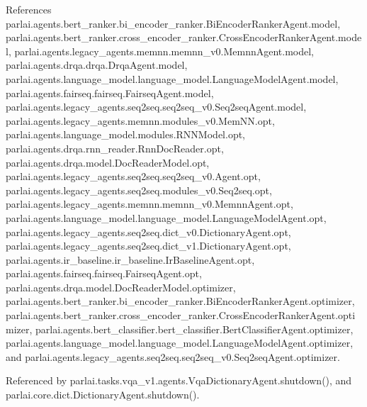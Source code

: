 References parlai.\+agents.\+bert\+\_\+ranker.\+bi\+\_\+encoder\+\_\+ranker.\+Bi\+Encoder\+Ranker\+Agent.\+model, parlai.\+agents.\+bert\+\_\+ranker.\+cross\+\_\+encoder\+\_\+ranker.\+Cross\+Encoder\+Ranker\+Agent.\+model, parlai.\+agents.\+legacy\+\_\+agents.\+memnn.\+memnn\+\_\+v0.\+Memnn\+Agent.\+model, parlai.\+agents.\+drqa.\+drqa.\+Drqa\+Agent.\+model, parlai.\+agents.\+language\+\_\+model.\+language\+\_\+model.\+Language\+Model\+Agent.\+model, parlai.\+agents.\+fairseq.\+fairseq.\+Fairseq\+Agent.\+model, parlai.\+agents.\+legacy\+\_\+agents.\+seq2seq.\+seq2seq\+\_\+v0.\+Seq2seq\+Agent.\+model, parlai.\+agents.\+legacy\+\_\+agents.\+memnn.\+modules\+\_\+v0.\+Mem\+N\+N.\+opt, parlai.\+agents.\+language\+\_\+model.\+modules.\+R\+N\+N\+Model.\+opt, parlai.\+agents.\+drqa.\+rnn\+\_\+reader.\+Rnn\+Doc\+Reader.\+opt, parlai.\+agents.\+drqa.\+model.\+Doc\+Reader\+Model.\+opt, parlai.\+agents.\+legacy\+\_\+agents.\+seq2seq.\+seq2seq\+\_\+v0.\+Agent.\+opt, parlai.\+agents.\+legacy\+\_\+agents.\+seq2seq.\+modules\+\_\+v0.\+Seq2seq.\+opt, parlai.\+agents.\+legacy\+\_\+agents.\+memnn.\+memnn\+\_\+v0.\+Memnn\+Agent.\+opt, parlai.\+agents.\+language\+\_\+model.\+language\+\_\+model.\+Language\+Model\+Agent.\+opt, parlai.\+agents.\+legacy\+\_\+agents.\+seq2seq.\+dict\+\_\+v0.\+Dictionary\+Agent.\+opt, parlai.\+agents.\+legacy\+\_\+agents.\+seq2seq.\+dict\+\_\+v1.\+Dictionary\+Agent.\+opt, parlai.\+agents.\+ir\+\_\+baseline.\+ir\+\_\+baseline.\+Ir\+Baseline\+Agent.\+opt, parlai.\+agents.\+fairseq.\+fairseq.\+Fairseq\+Agent.\+opt, parlai.\+agents.\+drqa.\+model.\+Doc\+Reader\+Model.\+optimizer, parlai.\+agents.\+bert\+\_\+ranker.\+bi\+\_\+encoder\+\_\+ranker.\+Bi\+Encoder\+Ranker\+Agent.\+optimizer, parlai.\+agents.\+bert\+\_\+ranker.\+cross\+\_\+encoder\+\_\+ranker.\+Cross\+Encoder\+Ranker\+Agent.\+optimizer, parlai.\+agents.\+bert\+\_\+classifier.\+bert\+\_\+classifier.\+Bert\+Classifier\+Agent.\+optimizer, parlai.\+agents.\+language\+\_\+model.\+language\+\_\+model.\+Language\+Model\+Agent.\+optimizer, and parlai.\+agents.\+legacy\+\_\+agents.\+seq2seq.\+seq2seq\+\_\+v0.\+Seq2seq\+Agent.\+optimizer.



Referenced by parlai.\+tasks.\+vqa\+\_\+v1.\+agents.\+Vqa\+Dictionary\+Agent.\+shutdown(), and parlai.\+core.\+dict.\+Dictionary\+Agent.\+shutdown().

